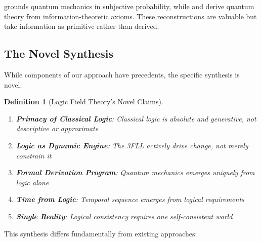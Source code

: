 \documentclass[12pt,a4paper]{article}
\newtheorem{definition}{Definition}
\begin{document}
\citet{fuchs2010qbism} grounds quantum mechanics in subjective probability, while \citet{hardy2001quantum} and \citet{chiribella2011informational} derive quantum theory from information-theoretic axioms. These reconstructions are valuable but take information as primitive rather than derived.

\subsection{The Novel Synthesis}

While components of our approach have precedents, the specific synthesis is novel:

\begin{definition}[Logic Field Theory's Novel Claims]
~\\
\begin{enumerate}
\item \textbf{Primacy of Classical Logic}: Classical logic is absolute and generative, not descriptive or approximate
\item \textbf{Logic as Dynamic Engine}: The 3FLL actively drive change, not merely constrain it
\item \textbf{Formal Derivation Program}: Quantum mechanics emerges uniquely from logic alone
\item \textbf{Time from Logic}: Temporal sequence emerges from logical requirements
\item \textbf{Single Reality}: Logical consistency requires one self-consistent world
\end{enumerate}
\end{definition}

This synthesis differs fundamentally from existing approaches:
\end{document}
